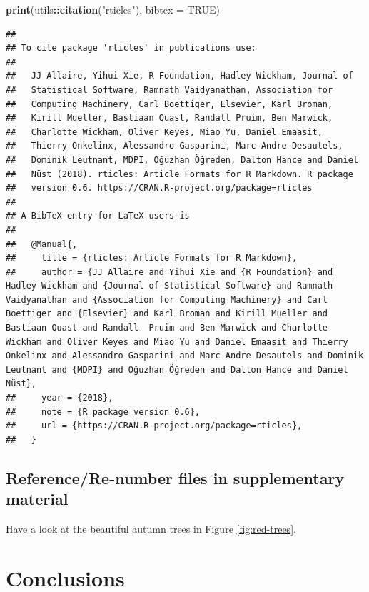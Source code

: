 \documentclass[12pt,]{article}
\newenvironment{Shaded}{\begin{snugshade}}{\end{snugshade}}
\newcommand{\KeywordTok}[1]{\textcolor[rgb]{0.13,0.29,0.53}{\textbf{#1}}}
\newcommand{\DataTypeTok}[1]{\textcolor[rgb]{0.13,0.29,0.53}{#1}}
\newcommand{\StringTok}[1]{\textcolor[rgb]{0.31,0.60,0.02}{#1}}
\newcommand{\OtherTok}[1]{\textcolor[rgb]{0.56,0.35,0.01}{#1}}
\newcommand{\OperatorTok}[1]{\textcolor[rgb]{0.81,0.36,0.00}{\textbf{#1}}}
\newcommand{\NormalTok}[1]{#1}
\begin{document}
\begin{Shaded}
\begin{Highlighting}[]
\KeywordTok{print}\NormalTok{(utils}\OperatorTok{::}\KeywordTok{citation}\NormalTok{(}\StringTok{"rticles"}\NormalTok{), }\DataTypeTok{bibtex =} \OtherTok{TRUE}\NormalTok{)}
\end{Highlighting}
\end{Shaded}

\begin{verbatim}
## 
## To cite package 'rticles' in publications use:
## 
##   JJ Allaire, Yihui Xie, R Foundation, Hadley Wickham, Journal of
##   Statistical Software, Ramnath Vaidyanathan, Association for
##   Computing Machinery, Carl Boettiger, Elsevier, Karl Broman,
##   Kirill Mueller, Bastiaan Quast, Randall Pruim, Ben Marwick,
##   Charlotte Wickham, Oliver Keyes, Miao Yu, Daniel Emaasit,
##   Thierry Onkelinx, Alessandro Gasparini, Marc-Andre Desautels,
##   Dominik Leutnant, MDPI, Oğuzhan Öğreden, Dalton Hance and Daniel
##   Nüst (2018). rticles: Article Formats for R Markdown. R package
##   version 0.6. https://CRAN.R-project.org/package=rticles
## 
## A BibTeX entry for LaTeX users is
## 
##   @Manual{,
##     title = {rticles: Article Formats for R Markdown},
##     author = {JJ Allaire and Yihui Xie and {R Foundation} and Hadley Wickham and {Journal of Statistical Software} and Ramnath  Vaidyanathan and {Association for Computing Machinery} and Carl Boettiger and {Elsevier} and Karl Broman and Kirill Mueller and Bastiaan Quast and Randall  Pruim and Ben Marwick and Charlotte Wickham and Oliver Keyes and Miao Yu and Daniel Emaasit and Thierry Onkelinx and Alessandro Gasparini and Marc-Andre Desautels and Dominik Leutnant and {MDPI} and Oğuzhan Öğreden and Dalton Hance and Daniel Nüst},
##     year = {2018},
##     note = {R package version 0.6},
##     url = {https://CRAN.R-project.org/package=rticles},
##   }
\end{verbatim}

\subsection{Reference/Re-number files in supplementary
material}\label{referencere-number-files-in-supplementary-material}

Have a look at the beautiful autumn trees in Figure \ref{fig:red-trees}.

\section{Conclusions}\label{conclusions}
\end{document}

